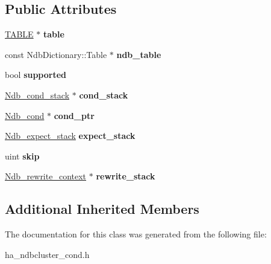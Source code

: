 \subsection*{Public Attributes}
\begin{DoxyCompactItemize}
\item 
\mbox{\label{classNdb__cond__traverse__context_aa83e9c6cbd41d81c41c54ae3362c9fcb}} 
\mbox{\hyperlink{structTABLE}{T\+A\+B\+LE}} $\ast$ {\bfseries table}
\item 
\mbox{\label{classNdb__cond__traverse__context_a047cd03a96548baa973c2ac29be32c14}} 
const Ndb\+Dictionary\+::\+Table $\ast$ {\bfseries ndb\+\_\+table}
\item 
\mbox{\label{classNdb__cond__traverse__context_a929cb5dd3f923d68537fbe9f65f8ec54}} 
bool {\bfseries supported}
\item 
\mbox{\label{classNdb__cond__traverse__context_ad6c0f4216b34d41e629db239fa88b645}} 
\mbox{\hyperlink{classNdb__cond__stack}{Ndb\+\_\+cond\+\_\+stack}} $\ast$ {\bfseries cond\+\_\+stack}
\item 
\mbox{\label{classNdb__cond__traverse__context_a498f586554573e0d48854849c97eb913}} 
\mbox{\hyperlink{classNdb__cond}{Ndb\+\_\+cond}} $\ast$ {\bfseries cond\+\_\+ptr}
\item 
\mbox{\label{classNdb__cond__traverse__context_abce8a631ba1045757c0f044f67f4f700}} 
\mbox{\hyperlink{classNdb__expect__stack}{Ndb\+\_\+expect\+\_\+stack}} {\bfseries expect\+\_\+stack}
\item 
\mbox{\label{classNdb__cond__traverse__context_acc57c472926bad06026746ec2b870067}} 
uint {\bfseries skip}
\item 
\mbox{\label{classNdb__cond__traverse__context_a7fab69f45e6f9a4d3ef86c9b5706b4c8}} 
\mbox{\hyperlink{classNdb__rewrite__context}{Ndb\+\_\+rewrite\+\_\+context}} $\ast$ {\bfseries rewrite\+\_\+stack}
\end{DoxyCompactItemize}
\subsection*{Additional Inherited Members}


The documentation for this class was generated from the following file\+:\begin{DoxyCompactItemize}
\item 
ha\+\_\+ndbcluster\+\_\+cond.\+h\end{DoxyCompactItemize}
